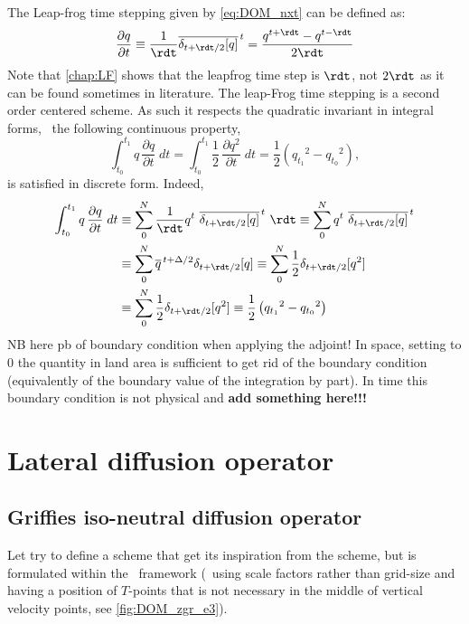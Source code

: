 \documentclass[../main/NEMO_manual]{subfiles}
\begin{document}
The Leap-frog time stepping given by \autoref{eq:DOM_nxt} can be defined as:
\[
  \frac{\partial q}{\partial t}
  \equiv \frac{1}{\rdt} \overline{ \delta_{t+\rdt/2}[q]}^{\,t}
  =         \frac{q^{t+\rdt}-q^{t-\rdt}}{2\rdt}
\]
Note that \autoref{chap:LF} shows that the leapfrog time step is $\rdt$,
not $2\rdt$ as it can be found sometimes in literature.
The leap-Frog time stepping is a second order centered scheme.
As such it respects the quadratic invariant in integral forms, \ie\ the following continuous property,
\[
  \int_{t_0}^{t_1} {q\, \frac{\partial q}{\partial t} \;dt}
  =\int_{t_0}^{t_1} {\frac{1}{2}\, \frac{\partial q^2}{\partial t} \;dt}
  =  \frac{1}{2} \left( {q_{t_1}}^2 - {q_{t_0}}^2 \right) ,
\]
is satisfied in discrete form.
Indeed,
\[
  \begin{split}
    \int_{t_0}^{t_1} {q\, \frac{\partial q}{\partial t} \;dt}
    &\equiv \sum\limits_{0}^{N}
    {\frac{1}{\rdt} q^t \ \overline{ \delta_{t+\rdt/2}[q]}^{\,t} \ \rdt}
    \equiv \sum\limits_{0}^{N}  { q^t \ \overline{ \delta_{t+\rdt/2}[q]}^{\,t} } \\
    &\equiv \sum\limits_{0}^{N}  { \overline{q}^{\,t+\Delta/2}{ \delta_{t+\rdt/2}[q]}}
    \equiv \sum\limits_{0}^{N}  { \frac{1}{2} \delta_{t+\rdt/2}[q^2] }\\
    &\equiv \sum\limits_{0}^{N}  { \frac{1}{2} \delta_{t+\rdt/2}[q^2] }
    \equiv \frac{1}{2} \left( {q_{t_1}}^2 - {q_{t_0}}^2 \right)
  \end{split}
\]
NB here pb of boundary condition when applying the adjoint!
In space, setting to 0 the quantity in land area is sufficient to get rid of the boundary condition
(equivalently of the boundary value of the integration by part).
In time this boundary condition is not physical and \textbf{add something here!!!}

\section{Lateral diffusion operator}

\subsection{Griffies iso-neutral diffusion operator}

Let try to define a scheme that get its inspiration from the \citet{griffies.gnanadesikan.ea_JPO98} scheme,
but is formulated within the \NEMO\ framework
(\ie\ using scale factors rather than grid-size and having a position of $T$-points that
is not necessary in the middle of vertical velocity points, see \autoref{fig:DOM_zgr_e3}).
\end{document}
